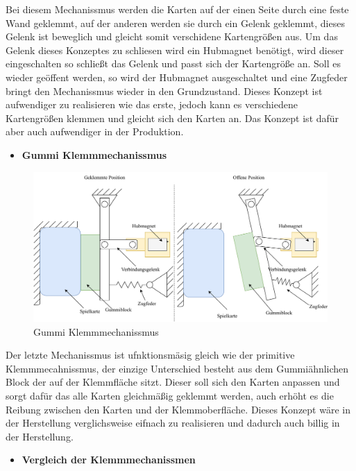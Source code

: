 Bei diesem Mechanissmus werden die Karten auf der einen Seite durch eine feste Wand geklemmt, auf der anderen werden sie durch ein Gelenk geklemmt, dieses Gelenk
ist beweglich und gleicht somit verschidene Kartengrößen aus. Um das Gelenk dieses Konzeptes zu schliesen wird ein Hubmagnet benötigt, wird dieser eingeschalten
so schließt das Gelenk und passt sich der Kartengröße an. Soll es wieder geöffent werden, so wird der Hubmagnet ausgeschaltet und eine Zugfeder bringt den Mechanissmus wieder in den
Grundzustand. Dieses Konzept ist aufwendiger zu realisieren wie das erste, jedoch kann es verschiedene Kartengrößen klemmen und gleicht sich den Karten an. Das Konzept ist
dafür aber auch aufwendiger in der Produktion.

\begin{itemize}
    \item \textbf{Gummi Klemmmechanissmus}
\end{itemize}

\begin{figure}[H]
    \centering
    \includegraphics[scale=0.5,page=1]{fig/mech/Klemmmechanissmus3}
    \caption{Gummi Klemmmechanissmus}
\end{figure}

Der letzte Mechanissmus ist ufnktionsmäsig gleich wie der primitive Klemmmecahnissmus, der einzige Unterschied besteht aus dem
Gummiähnlichen Block der auf der Klemmfläche sitzt. Dieser soll sich den Karten anpassen und sorgt dafür das alle Karten gleichmäßig
 geklemmt werden, auch erhöht es die Reibung zwischen den Karten und der Klemmoberfläche. Dieses Konzept wäre in der  Herstellung verglichsweise
eifnach zu realisieren und dadurch auch billig in der Herstellung.


\begin{itemize}
    \item \textbf{Vergleich der Klemmmechanissmen}
\end{itemize}

